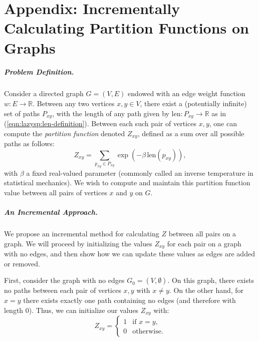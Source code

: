 \chapter{Appendix: Incrementally Calculating Partition Functions on Graphs}
\label{chap:appendix-partition}

\paragraph{Problem Definition.}
Consider a directed graph $G=(V,E)$ endowed with an edge weight
function $w : E \rightarrow \mathbb{R}$.
Between any two vertices $x,y \in V$,
there exist a (potentially infinite) set of paths $P_{xy}$,
with the length of any path given by
$\mbox{len} : P_{xy} \rightarrow \mathbb{R}$ as in
(\ref{eqn:lazysp:len-definition}).
Between each such pair of vertices $x,y$,
one can compute the \emph{partition function} denoted $Z_{xy}$,
defined as a sum over all possible paths as follows:
\begin{equation}
   Z_{xy} = \sum_{p_{xy} \in P_{xy}} \exp(- \beta \, \mbox{len}(p_{xy})),
   \label{eqn:def}
\end{equation}
with $\beta$ a fixed real-valued parameter
(commonly called an inverse temperature in statistical mechanics).
We wish to compute and maintain this partition function value
between all pairs of vertices $x$ and $y$ on $G$.

\paragraph{An Incremental Approach.}
We propose an incremental method for calculating $Z$ between all pairs
on a graph.
We will proceed by initializing the values $Z_{xy}$ for each pair
on a graph with no edges,
and then show how we can update these values as edges are added
or removed.

First,
consider the graph with no edges $G_0 = (V, \emptyset)$.
On this graph, there exists no paths between each pair of vertices
$x,y$ with $x \neq y$.
On the other hand,
for $x=y$ there exists exactly one path
containing no edges (and therefore with length $0$).
Thus, we can initialize our values $Z_{xy}$ with:
\begin{equation}
   Z_{xy} = \left\{ \begin{array}{cl}
      1 & \mbox{if } x = y, \\
      0 & \mbox{otherwise}.
   \end{array}\right.
\end{equation}

